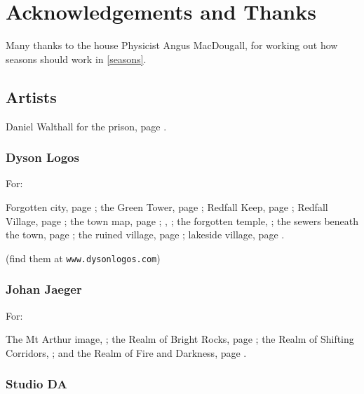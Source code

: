 
\section*{Acknowledgements and Thanks}

\begin{multicols}{2}

Many thanks to the house Physicist Angus MacDougall, for working out how seasons should work in \autoref{seasons}.

\subsection*{Artists}

Daniel Walthall for the prison, page \pageref{Daniel_Walthall/prison}.

\subsubsection{Dyson Logos}

For:

Forgotten city, page \pageref{Dyson_Logos/forgotten_city};
the Green Tower, page \pageref{Dyson_Logos/green_tower};
Redfall Keep, page \pageref{Dyson_Logos/redfall_keep};
Redfall Village, page \pageref{Dyson_Logos/redfall};
the town map, page \pageref{Dyson_Logos/town};
, \pageref{Dyson_Logos/mincing_pig};
the forgotten temple, \pageref{Dyson_Logos/qualme_temple};
the sewers beneath the town, page \pageref{Dyson_Logos/sewer};
the ruined village, page \pageref{Dyson_Logos/ruined_village};
lakeside village, page \pageref{Dyson_Logos/lakeside}.

(find them at {\tt www.dysonlogos.com})

\subsubsection{Johan Jaeger}

For:

The Mt Arthur image, \pageref{Johan_Jaeger/mountain_river};
the Realm of Bright Rocks, page \pageref{Johan_Jaeger/desert_wizard};
the Realm of Shifting Corridors, \pageref{Johan_Jaeger/ancient_rocks};
and the Realm of Fire and Darkness, page \pageref{Johan_Jaeger/a_light_in_the_dark}.
\subsubsection{Studio DA}


\end{multicols}
